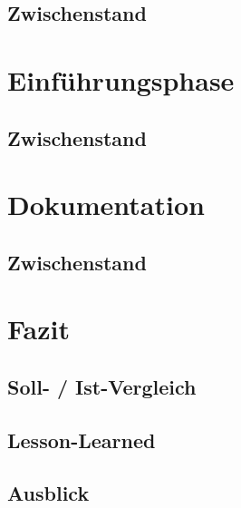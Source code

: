 \documentclass[12pt, xcolor=dvipsnames]{scrartcl}
\begin{document}
\subsection{Zwischenstand}

\section{Einführungsphase}

\subsection{Zwischenstand}


\section{Dokumentation}

\subsection{Zwischenstand}

\section{Fazit}

\subsection{Soll- / Ist-Vergleich}

\subsection{Lesson-Learned}

\subsection{Ausblick}

\newpage


\end{document}
